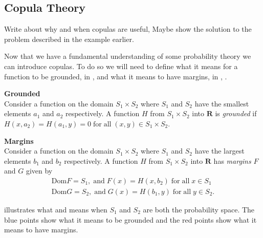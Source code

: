 \subsection{Copula Theory}

\begin{generalinstructions}
    Write about why and when copulas are useful, Maybe show the solution to the problem described in the example earlier.
\end{generalinstructions}

Now that we have a fundamental understanding of some probability theory we can introduce copulas. To do so we will need to define what it means for a function to be grounded, in , and what it means to have margins, in , \citet[p.~9]{Nelsen2006}.

\begin{definition}\label{def:grounded}\textbf{Grounded} \\
    Consider a function on the domain $S_1\times S_2$ where $S_1$ and $S_2$ have the smallest elements $a_1$ and $a_2$ respectively. A function $H$ from $S_1\times S_2$ into $\mathbf{R}$ is \emph{grounded} if $H(x,a_2)= H(a_1,y) = 0 \;\mathrm{for \;all\;} (x,y) \in S_1\times S_2.$
\end{definition}

\begin{definition}\label{def:margins}
    \textbf{Margins}\\
    Consider a function on the domain $S_1\times S_2$ where $S_1$ and $S_2$ have the largest elements $b_1$ and $b_2$ respectively. A function $H$ from $S_1\times S_2$ into $\mathbf{R}$ has \emph{margins} $F$ and $G$ given by
    \begin{align*}
        \mathrm{Dom}F = S_1, \;\mathrm{and }\; F(x) = H(x,b_2) \;\mathrm{for \;all\;} x \in S_1\\
        \mathrm{Dom}G = S_2, \;\mathrm{and }\; G(x) = H(b_1,y) \;\mathrm{for \;all\;} y \in S_2.
    \end{align*}
\end{definition}

 illustrates what  and  means when $S_1$ and $S_2$ are both the probability space. The blue points show what it means to be grounded and the red points show what it means to have margins. 

